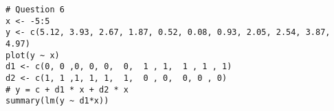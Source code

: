 \begin{frame}[fragile]
\begin{framed}
\begin{verbatim}
# Question 6
x <- -5:5
y <- c(5.12, 3.93, 2.67, 1.87, 0.52, 0.08, 0.93, 2.05, 2.54, 3.87, 4.97)
plot(y ~ x)
d1 <- c(0, 0 ,0, 0, 0,  0,  1 , 1,  1 , 1 , 1)
d2 <- c(1, 1 ,1, 1, 1,  1,  0 , 0,  0, 0 , 0) 
# y = c + d1 * x + d2 * x 
summary(lm(y ~ d1*x))
\end{verbatim}
\end{framed}
\end{frame}
